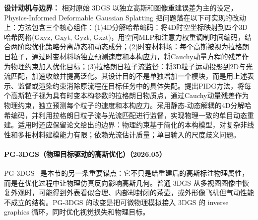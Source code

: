 \textbf{设计动机与边界：} 相对原始 3DGS 以独立高斯和图像重建误差为主的设定，Physics-Informed Deformable Gaussian Splatting 把问题落在以下可实现的改动上：方法包含三个核心组件：(1)4D分解哈希编码：将4D时空坐标映射到四个3D哈希网格(Gxyz, Gxyt, Gyzt, Gxzt)，用空间MLP和注意力权重调制时间编码，结合两阶段优化策略分离静态和动态成分；(2)时变材料场：每个高斯被视为拉格朗日粒子，通过时变材料场独立预测速度和本构应力，将Cauchy动量方程的残差作为物理约束加入优化目标；(3)拉格朗日粒子流监督：将3D粒子运动投影到2D与光流匹配，加速收敛并提高泛化。其设计目的不是单独增加一个模块，而是用上述表示、监督或渲染约束消除原流程在目标任务中的具体失配。提出PIDG方法，将每个高斯粒子视为具有时变本构参数的拉格朗日物质点，通过Cauchy动量残差作为物理约束，独立预测每个粒子的速度和本构应力。采用静态-动态解耦的4D分解哈希编码，并利用拉格朗日粒子流与光流匹配进行监督，实现物理一致的单目动态重建。适用时还应保留论文给出的边界：物理约束基于简化的本构模型，对复杂非线性和多相材料建模能力有限；依赖光流估计质量；单目输入的尺度歧义问题。
\paragraph{PG-3DGS（物理目标驱动的高斯优化）（2026.05）}
PG-3DGS~\cite{2605_11266} 是本节的另一条重要锚点：它不只是给重建后的高斯标注物理属性，而是在优化过程中让物理仿真反向影响高斯几何。普通 3DGS 从多视图图像中恢复外观时，可能得到外表看似合理、内部却封闭的茶壶，或外形像飞机但气动性能不成立的结构。PG-3DGS 的改变是把可微物理模拟接入 3DGS 的 inverse graphics 循环，同时优化视觉损失和物理目标。

